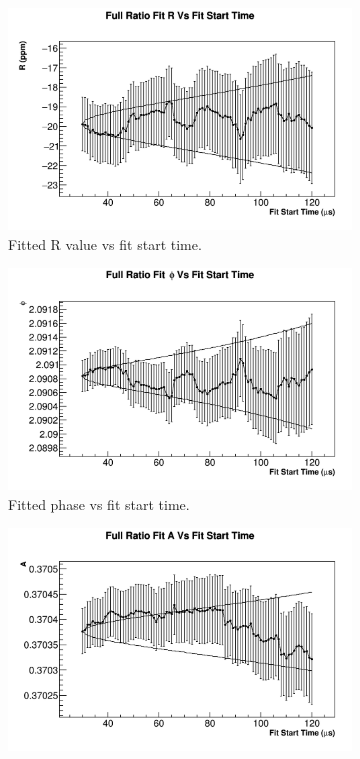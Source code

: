 \begin{figure}[]
\centering
    \begin{subfigure}[t]{0.45\textwidth}
	    \centering
		\includegraphics[width=\textwidth]{RatioCBO_R_FS_Canv}
	    \caption{Fitted R value vs fit start time.}
    \end{subfigure}
    \begin{subfigure}[t]{0.45\textwidth}
	    \centering
		\includegraphics[width=\textwidth]{RatioCBO_phi_FS_Canv}
	    \caption{Fitted \gmtwo phase vs fit start time.}
    \end{subfigure}%
    \vspace{4mm}
    \begin{subfigure}[t]{0.45\textwidth}
	    \centering
		\includegraphics[width=\textwidth]{RatioCBO_A_FS_Canv}

\end{subfigure}
\end{figure}

